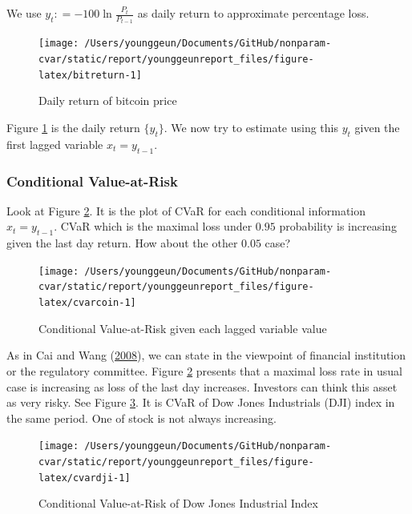 \documentclass[
]{article}
\theoremstyle{definition}
\theoremstyle{definition}
\theoremstyle{definition}
\theoremstyle{remark}
\begin{document}
We use \(y_t \mathpunct{:}=- 100 \ln \frac{P_t}{P_{t - 1}}\) as daily return to approximate percentage loss.

\begin{figure}[H]

{\centering \texttt{[image: /Users/younggeun/Documents/GitHub/nonparam-cvar/static/report/younggeunreport\_files/figure-latex/bitreturn-1]} 

}

\caption{Daily return of bitcoin price}\label{fig:bitreturn}
\end{figure}

Figure \ref{fig:bitreturn} is the daily return \(\{ y_t \}\). We now try to estimate using this \(y_t\) given the first lagged variable \(x_t = y_{t - 1}\).

\hypertarget{conditional-value-at-risk}{%
\subsubsection{Conditional Value-at-Risk}\label{conditional-value-at-risk}}

Look at Figure \ref{fig:cvarcoin}. It is the plot of CVaR for each conditional information \(x_t = y_{t - 1}\). CVaR which is the maximal loss under \(0.95\) probability is increasing given the last day return. How about the other \(0.05\) case?

\begin{figure}[H]

{\centering \texttt{[image: /Users/younggeun/Documents/GitHub/nonparam-cvar/static/report/younggeunreport\_files/figure-latex/cvarcoin-1]} 

}

\caption{Conditional Value-at-Risk given each lagged variable value}\label{fig:cvarcoin}
\end{figure}

As in Cai and Wang (\protect\hyperlink{ref-cai:2008aa}{2008}), we can state in the viewpoint of financial institution or the regulatory committee. Figure \ref{fig:cvarcoin} presents that a maximal loss rate in usual case is increasing as loss of the last day increases. Investors can think this asset as very risky. See Figure \ref{fig:cvardji}. It is CVaR of Dow Jones Industrials (DJI) index in the same period. One of stock is not always increasing.

\begin{figure}[H]

{\centering \texttt{[image: /Users/younggeun/Documents/GitHub/nonparam-cvar/static/report/younggeunreport\_files/figure-latex/cvardji-1]} 

}

\caption{Conditional Value-at-Risk of Dow Jones Industrial Index}\label{fig:cvardji}
\end{figure}
\end{document}
